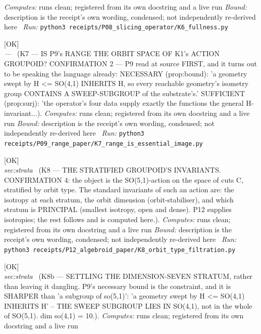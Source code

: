 \begin{description}
\emph{Computes:} runs clean; registered from its own docstring and a live run
 \emph{Bound:} description is the receipt's own wording, condensed; not independently re-derived here
\ \emph{Run:} \texttt{python3 receipts/P08\_slicing\_operator/K6\_fullness.py}
\item[\label{rcpt:K7_range_is_essential_image}\texttt{K7\_range\_is\_essential\_image}]\hfill\textsf{[OK]}\\
\textit{---} \ (K7 --- IS P9's RANGE THE ORBIT SPACE OF K1's ACTION GROUPOID? CONFIRMATION 2 --- P9 read at source FIRST, and it turns out to be speaking the language already: NECESSARY (prop:bound): 'a geometry swept by H <= SO(4,1) INHERITS H, so every reachable geometry's isometry group CONTAINS A SWEEP-SUBGROUP of the substrate's.' SUFFICIENT (prop:surj): 'the operator's four data supply exactly the functions the general H-invariant...). 
\emph{Computes:} runs clean; registered from its own docstring and a live run
 \emph{Bound:} description is the receipt's own wording, condensed; not independently re-derived here
\ \emph{Run:} \texttt{python3 receipts/P09\_range\_paper/K7\_range\_is\_essential\_image.py}
\item[\label{rcpt:K8_orbit_type_filtration}\texttt{K8\_orbit\_type\_filtration}]\hfill\textsf{[OK]}\\
\textit{sec:strata} \ (K8 --- THE STRATIFIED GROUPOID'S INVARIANTS. CONFIRMATION 4: the object is the SO(5,1)-action on the space of cuts C, stratified by orbit type. The standard invariants of such an action are: the isotropy at each stratum, the orbit dimension (orbit-stabiliser), and which stratum is PRINCIPAL (smallest isotropy, open and dense). P12 supplies isotropies; the rest follows and is computed here.). 
\emph{Computes:} runs clean; registered from its own docstring and a live run
 \emph{Bound:} description is the receipt's own wording, condensed; not independently re-derived here
\ \emph{Run:} \texttt{python3 receipts/P12\_algebroid\_paper/K8\_orbit\_type\_filtration.py}
\item[\label{rcpt:K8b_dim_seven_empty}\texttt{K8b\_dim\_seven\_empty}]\hfill\textsf{[OK]}\\
\textit{sec:strata} \ (K8b --- SETTLING THE DIMENSION-SEVEN STRATUM, rather than leaving it dangling. P9's necessary bound is the constraint, and it is SHARPER than 'a subgroup of so(5,1)': 'a geometry swept by H <= SO(4,1) INHERITS H' -- THE SWEEP SUBGROUP LIES IN SO(4,1), not in the whole of SO(5,1). dim so(4,1) = 10.). 
\emph{Computes:} runs clean; registered from its own docstring and a live run

\end{description}
